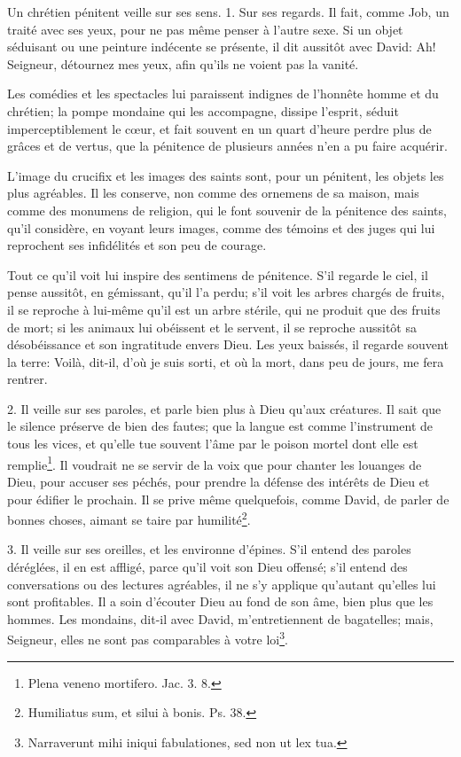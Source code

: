 \documentclass[instructions.tex]{subfiles}
\begin{document}
\secundo Un chrétien pénitent veille sur ses sens. 1. Sur ses regards. Il fait, comme Job, un traité avec ses yeux, pour ne pas même penser à l’autre sexe. Si un objet séduisant ou une peinture indécente se présente, il dit aussitôt avec David: Ah! Seigneur, détournez mes yeux, afin qu’ils ne voient pas la vanité.
 
Les comédies et les spectacles lui paraissent indignes de l’honnête homme et du chrétien; la pompe mondaine qui les accompagne, dissipe l’esprit, séduit imperceptiblement le cœur, et fait souvent en un quart d’heure perdre plus de grâces et de vertus, que la pénitence de plusieurs années n’en a pu faire acquérir.
 
L’image du crucifix et les images des saints sont, pour un pénitent, les objets les plus agréables. Il les conserve, non comme des ornemens de sa maison, mais comme des monumens de religion, qui le font souvenir de la pénitence des saints, qu’il considère, en voyant leurs images, comme des témoins et des juges qui lui reprochent ses infidélités et son peu de courage.
 
Tout ce qu’il voit lui inspire des sentimens de pénitence. S’il regarde le ciel, il pense aussitôt, en gémissant, qu’il l’a perdu; s’il voit les arbres chargés de fruits, il se reproche à lui-même qu’il est un arbre stérile, qui ne produit que des fruits de mort; si les animaux lui obéissent et le servent, il se reproche aussitôt sa désobéissance et son ingratitude envers Dieu. Les yeux baissés, il regarde souvent la terre: Voilà, dit-il, d’où je suis sorti, et où la mort, dans peu de jours, me fera rentrer.
 
2. Il veille sur ses paroles, et parle bien plus à Dieu qu’aux créatures. Il sait que le silence préserve de bien des fautes; que la langue est comme l’instrument de tous les vices, et qu’elle tue souvent l’âme par le poison mortel dont elle est remplie\footnote{Plena veneno mortifero. Jac. 3. 8.}. Il voudrait ne se servir de la voix que pour chanter les louanges de Dieu, pour accuser ses péchés, pour prendre la défense des intérêts de Dieu et pour édifier le prochain. Il se prive même quelquefois, comme David, de parler de bonnes choses, aimant se taire par humilité\footnote{Humiliatus sum, et silui à bonis. Ps. 38.}.
 
3. Il veille sur ses oreilles, et les environne d’épines. S’il entend des paroles déréglées, il en est affligé, parce qu’il voit son Dieu offensé; s’il entend des conversations ou des lectures agréables, il ne s’y applique qu’autant qu’elles lui sont profitables. Il a soin d’écouter Dieu au fond de son âme, bien plus que les hommes. Les mondains, dit-il avec David, m’entretiennent de bagatelles; mais, Seigneur, elles ne sont pas comparables à votre loi\footnote{Narraverunt mihi iniqui fabulationes, sed non ut lex tua.}.
 
\end{document}
